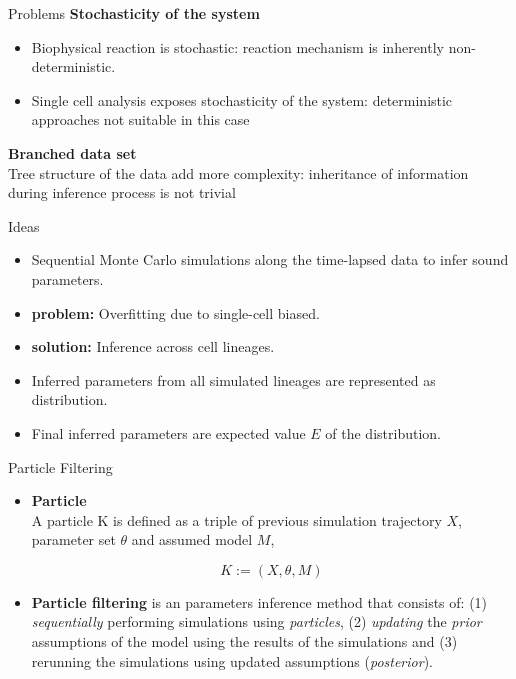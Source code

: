 \documentclass[pdf]
{beamer}
\begin{document}
\begin{frame}{Problems}
	\textbf{Stochasticity of the system}
	\begin{itemize}
	\item Biophysical reaction is stochastic: reaction mechanism is inherently non-deterministic.
	\item Single cell analysis exposes stochasticity of the system: deterministic approaches not suitable in this case
	\end{itemize}
	\textbf{Branched data set}\\
	Tree structure of the data add more complexity: inheritance of information during inference process is not trivial
\end{frame}

\begin{frame}{Ideas}
	\begin{itemize}
	\item Sequential Monte Carlo simulations along the time-lapsed data to infer sound parameters.
	\item<2-> \textbf{problem:} Overfitting due to single-cell biased.
	\item<3-> \textbf{solution:} Inference across cell lineages.
	\item<4-> Inferred parameters from all simulated lineages are represented as distribution.
	\item<5-> Final inferred parameters are expected value $E$ of the distribution.
	\end{itemize}
\end{frame}

\begin{frame}{Particle Filtering}

	\begin{itemize}

	\item \textbf{Particle}\\
	A particle K is defined as a triple of previous simulation trajectory $X$, parameter set $\theta$ and
assumed model $M$,

		\begin{equation}
		K := (X, \theta, M)
		\end{equation}
		
	\item \textbf{Particle filtering} is an parameters inference method that consists of: (1) \textit{sequentially} performing simulations using \textit{particles}, (2) \textit{updating} the \textit{prior} assumptions of the model using the results of the simulations and (3) rerunning the simulations using updated assumptions (\textit{posterior}).
	
	\end{itemize}

\end{frame}
\end{document}
